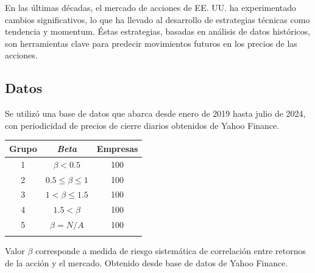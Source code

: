 \documentclass[a0,portrait]{a0poster}
\newcommand{\customsection}[1]{
    \begin{center}
        \begin{tcolorbox}[colframe=miRojo!50, colback=miRojo, width=\linewidth, boxrule=1mm, arc=3mm, auto outer arc]
            \centering
            \vspace{.5cm} %
            \color{white}
            \section*{ \textbf{\Huge #1}}  %
            \vspace{.2cm} %
        \end{tcolorbox}
    \end{center}
}
\begin{document}
\begin{multicols}{2}
    En las últimas décadas, el mercado de acciones de EE. UU. ha experimentado cambios significativos, lo que ha llevado al
    desarrollo de estrategias técnicas como tendencia y momentum. Éstas estrategias, basadas en análisis de datos históricos, 
    son herramientas clave para predecir movimientos futuros en los precios de las acciones.
    \customsection{Datos}
    \par
    Se utilizó una base de datos que abarca desde enero de 2019 hasta julio de 2024, con periodicidad de precios de cierre 
    diarios obtenidos de Yahoo Finance.\\
    \begin{minipage}{.984\linewidth}
        \centering
        \vspace{1cm}
        \begin{tabular}{ccc}
            \toprule
            \textbf{Grupo} & \textbf{\textit{Beta}}  &\textbf{Empresas} \\
            \midrule
            1   &  $\beta < 0.5$  & 100                    \\
            2       & $0.5 \leq \beta \leq 1$  & 100  \\
            3      & $1 < \beta \leq 1.5$ & 100   \\
            4       & $1.5 < \beta $ & 100   \\
            5       & $\beta =N/A$  & 100  \\
            \bottomrule
            \vspace{.5cm}
        \end{tabular}
        \captionsetup{width=0.8\textwidth}  %
        \caption*{\footnotesize Valor $\beta$ corresponde a medida 
        de riesgo sistemática de correlación entre retornos de la acción 
        y el mercado. Obtenido desde base de datos de Yahoo Finance.
        }


\end{minipage}
\end{multicols}
\end{document}
